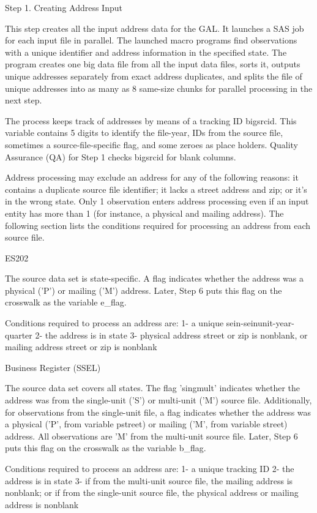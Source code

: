                  Step 1. Creating Address Input

This step creates all the input address data for the GAL. It launches a SAS job for each input file in
parallel. The launched macro programs find observations with a unique identifier and address
information in the specified state. The program creates one big data file from all the input data files, sorts
it, outputs unique addresses separately from exact address duplicates, and splits the file of unique
addresses into as many as 8 same-size chunks for parallel processing in the next step. 

The process keeps track of addresses by means of a tracking ID bigsrcid. This variable contains 5 digits
to identify the file-year, IDs from the source file, sometimes a source-file-specific flag, and some zeroes
as place holders. Quality Assurance (QA) for Step 1 checks bigsrcid for blank columns.

Address processing may exclude an address for any of the following reasons: it contains a duplicate
source file identifier; it lacks a street address and zip; or it's in the wrong state. Only 1 observation enters
address processing even if an input entity has more than 1 (for instance, a physical and mailing address).
The following section lists the conditions required for processing an address from each source file. 

ES202

The source data set is state-specific. A flag indicates whether the address was a physical ('P') or mailing
('M') address. Later, Step 6 puts this flag on the crosswalk as the variable e_flag.

Conditions required to process an address are:
1-   a unique sein-seinunit-year-quarter
2-   the address is in state
3-   physical address street or zip is nonblank, or mailing address street or zip is nonblank

Business Register (SSEL)

The source data set covers all states. The flag 'singmult' indicates whether the address was from the
single-unit ('S') or multi-unit ('M') source file. Additionally, for observations from the single-unit file, a
flag indicates whether the address was a physical ('P', from variable pstreet) or mailing ('M', from
variable street) address. All observations are 'M' from the multi-unit source file. Later, Step 6 puts this
flag on the crosswalk as the variable b_flag. 

Conditions required to process an address are:
1-   a unique tracking ID
2-   the address is in state
3-   if from the multi-unit source file, the mailing address is nonblank; or if from the single-unit
     source file, the physical address or mailing address is nonblank

